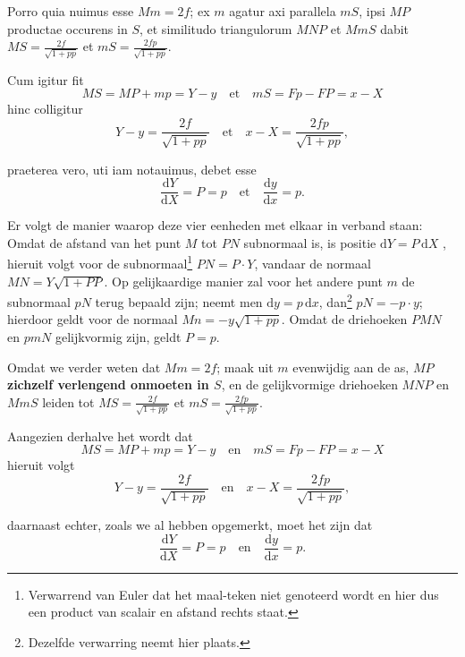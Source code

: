 \documentclass[10pt,a4paper]{article}
\def\D{\mathrm{d}}
\begin{document}
\begin{paracol}{2}
\begin{enumerate}[topsep=1px]
		\newpage
		
		Porro quia nuimus esse $Mm=2f$; ex $m$ agatur axi parallela $mS$, ipsi $MP$ productae occurens in $S$, et similitudo triangulorum $MNP$ et $MmS$ dabit $MS = \frac{2f}{\sqrt{1+pp}}$ et $mS = \frac{2fp}{\sqrt{1+pp}}$.
		\par Cum igitur fit
		\[
			MS = MP + mp = Y-y  \quad \text{et} \quad mS = Fp-FP = x-X
		\]
		hinc colligitur
		\[
			Y-y = \frac{2f}{\sqrt{1+pp}} \quad \text{et}\quad x-X = \frac{2fp}{\sqrt{1+pp}},
		\]
		
		\par praeterea vero, uti iam notauimus, debet esse
		\[
			\frac{\D Y}{\D X} = P = p \quad \text{et} \quad \frac{\D y}{\D x} = p.
		\]
		
		\switchcolumn
		
		\par Er volgt de manier waarop deze vier eenheden met elkaar in verband staan: Omdat de afstand van het punt $M$ tot $PN$ subnormaal is, is positie $\D Y = P \,\D X$ , hieruit volgt voor de subnormaal\footnote{Verwarrend van Euler dat het maal-teken niet genoteerd wordt en hier dus een product van scalair en afstand rechts staat.} $PN = P\cdot Y$,  vandaar de normaal $MN = Y\sqrt{1+PP}$. Op gelijkaardige manier zal voor het andere punt $m$ de subnormaal $pN$ terug bepaald zijn; neemt men $\D y = p \, \D x$, dan\footnote{Dezelfde verwarring neemt hier plaats.} $pN=-p\cdot y$; hierdoor geldt voor de normaal $Mn=-y\sqrt{1+pp}$. Omdat de driehoeken $PMN$ en $pmN$ gelijkvormig zijn, geldt $P=p$. 
		
		\newpage
		Omdat we verder weten dat $Mm=2f$; maak uit $m$ evenwijdig aan de as, \textbf{$MP$ zichzelf verlengend onmoeten in $S$}, en de gelijkvormige driehoeken $MNP$ en $MmS$ leiden tot $MS = \frac{2f}{\sqrt{1+pp}}$ et $mS = \frac{2fp}{\sqrt{1+pp}}$.
		\par Aangezien derhalve het wordt dat
		\[
			MS = MP + mp = Y-y  \quad \text{en} \quad mS = Fp-FP = x-X
		\]
		hieruit volgt
		\[
			Y-y = \frac{2f}{\sqrt{1+pp}} \quad \text{en}\quad x-X = \frac{2fp}{\sqrt{1+pp}},
		\]
		\par daarnaast echter, zoals we al hebben opgemerkt, moet het zijn dat
		\[
			\frac{\D Y}{\D X} = P = p \quad \text{en} \quad \frac{\D y}{\D x} = p.
		\]
				
		\switchcolumn*
		

\end{enumerate}
\end{paracol}
\end{document}
